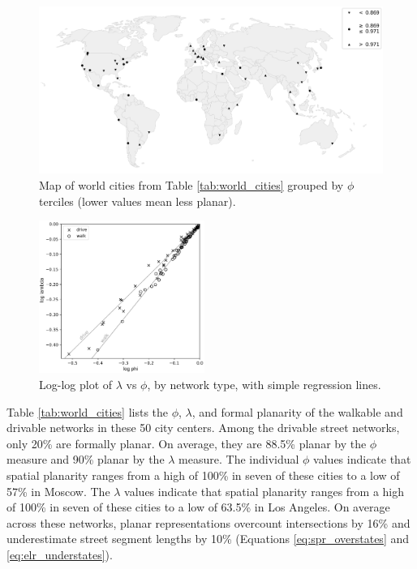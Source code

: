 \documentclass[Afour,sageh,times]{sagej}
\begin{document}
\begin{figure}[htbp]
	\center
	\includegraphics[width=\textwidth]{world_map_phi_bw.png}
	\caption{Map of world cities from Table \ref{tab:world_cities} grouped by $\phi$ terciles (lower values mean less planar).}
	\label{fig:world_map_bw}
\end{figure}

\begin{figure}[htbp]
	\includegraphics[width=0.48\textwidth]{regression_phi_split.png}
	\caption{Log-log plot of $\lambda$ vs $\phi$, by network type, with simple regression lines.}
	\label{fig:regression_split}
\end{figure}

Table \ref{tab:world_cities} lists the $\phi$, $\lambda$, and formal planarity of the walkable and drivable networks in these 50 city centers. Among the drivable street networks, only 20\% are formally planar. On average, they are 88.5\% planar by the $\phi$ measure and 90\% planar by the $\lambda$ measure. The individual $\phi$ values indicate that spatial planarity ranges from a high of 100\% in seven of these cities to a low of 57\% in Moscow. The $\lambda$ values indicate that spatial planarity ranges from a high of 100\% in seven of these cities to a low of 63.5\% in Los Angeles. On average across these networks, planar representations overcount intersections by 16\% and underestimate street segment lengths by 10\% (Equations \ref{eq:spr_overstates} and \ref{eq:elr_understates}).
\end{document}
